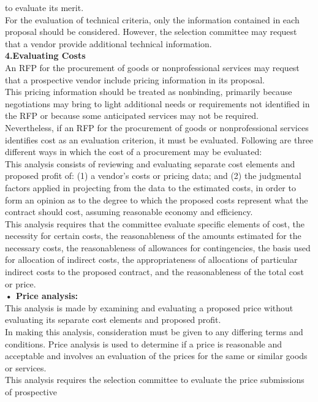 \documentclass[12pt]{article}
\begin{document}
to evaluate its merit.
\\For the evaluation of technical criteria, only the information contained in each
proposal should be considered. However, the selection committee may request
that a vendor provide additional technical information.
\\
\textbf{4.Evaluating Costs}
\\An RFP for the procurement of goods or nonprofessional services may request
that a prospective vendor include pricing information in its proposal. \\This pricing
information should be treated as nonbinding, primarily because negotiations may
bring to light additional needs or requirements not identified in the RFP or
because some anticipated services may not be required.
\\Nevertheless, if an RFP for the procurement of goods or nonprofessional
services identifies cost as an evaluation criterion, it must be evaluated.
Following are three different ways in which the cost of a procurement may be
evaluated: \\
This analysis consists of reviewing and evaluating separate
cost elements and proposed profit of: (1) a vendor’s costs or pricing data;
and (2) the judgmental factors applied in projecting from the data to the
estimated costs, in order to form an opinion as to the degree to which the
proposed costs represent what the contract should cost, assuming
reasonable economy and efficiency.
\\This analysis requires that the committee evaluate specific elements of cost, the necessity for certain
costs, the reasonableness of the amounts estimated for the necessary
costs, the reasonableness of allowances for contingencies, the basis used
for allocation of indirect costs, the appropriateness of allocations of
particular indirect costs to the proposed contract, and the reasonableness
of the total cost or price.\\
\textbf{• Price analysis:}
\\ This analysis is made by examining and evaluating a
proposed price without evaluating its separate cost elements and
proposed profit.\\ In making this analysis, consideration must be given to
any differing terms and conditions. Price analysis is used to determine if a
price is reasonable and acceptable and involves an evaluation of the
prices for the same or similar goods or services. \\This analysis requires the
selection committee to evaluate the price submissions of prospective
\end{document}
